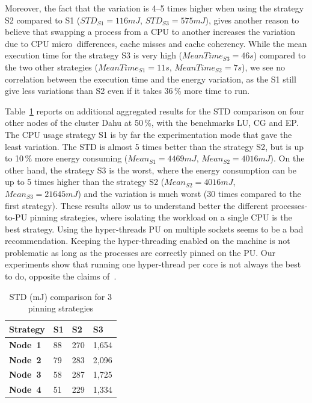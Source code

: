 Moreover, the fact that the variation is 4--5 times higher when using the strategy \textsf{S2} compared to \textsf{S1} ($STD_{S1}=116 mJ$, $STD_{S3}=575 mJ$), gives another reason to believe that swapping a process from a CPU to another increases the variation due to CPU micro~differences, cache misses and cache coherency.
While the mean execution time for the strategy \textsf{S3} is very high ($MeanTime_{S3}= 46 s$) compared to the two other strategies ($MeanTime_{S1}= 11 s$, $MeanTime_{S2}= 7 s$), we see no correlation between the execution time and the energy variation, as the \textsf{S1} still give less variations than \textsf{S2} even if it takes 36\,\% more time to run.

Table~\ref{table:corespinning} reports on additional aggregated results for the STD comparison on four other nodes of the cluster \textsf{Dahu} at 50\,\%, with the benchmarks \textsf{LU}, \textsf{CG} and \textsf{EP}.
The CPU usage strategy \textsf{S1} is by far the experimentation mode that gave the least variation.
The STD is almost 5 times better than the strategy \textsf{S2}, but is up to 10\,\% more energy consuming ($Mean_{S1}=4469 mJ$, $Mean_{S2}=4016 mJ$).
On the other hand, the strategy \textsf{S3} is the worst, where the energy consumption can be up to 5 times higher than the strategy \textsf{S2} ($Mean_{S2}=4016 mJ$, $Mean_{S3}=21645 mJ$) and the variation is much worst (30 times compared to the first strategy).
These results allow us to understand better the different processes-to-PU pinning strategies, where isolating the workload on a single CPU is the best strategy.
Using the hyper-threads PU on multiple sockets seems to be a bad recommendation. Keeping the hyper-threading enabled on the machine is not problematic as long as the processes are correctly pinned on the PU.
Our experiments show that running one hyper-thread per core is not always the best to do, opposite the claims of~\cite{marathe_empirical_2017_m}.

\begin{table}
    \centering
    \caption{STD (mJ) comparison for 3 pinning strategies}
    \label{table:corespinning}
    \small
    \begin{tabular}{|l|l|l|l|}
        \hline
        \textbf{Strategy} & \textbf{S1} & \textbf{S2} & \textbf{S3} \\
        \hline
        \hline
        \textbf{Node~1}   & 88          & 270         & 1,654       \\
        \hline
        \textbf{Node~2}   & 79          & 283         & 2,096       \\
        \hline
        \textbf{Node~3}   & 58          & 287         & 1,725       \\
        \hline
        \textbf{Node~4}   & 51          & 229         & 1,334       \\
        \hline
    \end{tabular}
\end{table}

